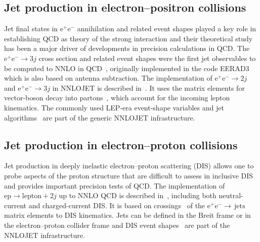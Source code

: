 \documentclass{SciPost}
\DeclareRobustCommand{\ensuremathrm}[1]{\ensuremath{\mathrm{#1}}}
\DeclareRobustCommand{\jets}{{\mathrm{jets}}\xspace}
\DeclareRobustCommand{\Pe}{{\ensuremathrm{e}}\xspace}
\DeclareRobustCommand{\Pep}{{\ensuremathrm{e^+}}\xspace}
\DeclareRobustCommand{\Pem}{{\ensuremathrm{e^-}}\xspace}
\DeclareRobustCommand{\Pp}{{\ensuremathrm{p}}\xspace}
\begin{document}
\subsection{Jet production in electron--positron collisions}
Jet final states in $\Pep\Pem$ annihilation and related event shapes played a key role in establishing QCD as theory of the strong interaction and their
theoretical study has been a major driver of developments in precision calculations in QCD. The $\Pep\Pem\to 3j$ cross section and related event shapes were the first jet
observables to be computed to NNLO in QCD~\cite{Gehrmann-DeRidder:2007vsv}, originally
implemented in the code EERAD3~\cite{Gehrmann-DeRidder:2014hxk} which is also based on antenna subtraction.
The implementation of $\Pep\Pem\to 2j$ and $\Pep\Pem\to 3j$  in NNLOJET is described in~\cite{Gehrmann:2017xfb}. It uses the matrix elements
for vector-boson decay into partons~\cite{Hagiwara:1988pp,Berends:1988yn,Bern:1997sc,Garland:2001tf,Garland:2002ak,Gehrmann:2002zr,Gehrmann:2011ab}, which account for the incoming lepton kinematics. The commonly used LEP-era event-shape variables and jet algorithms~\cite{Biebel:2001dm} are part
of the generic NNLOJET infrastructure.

\subsection{Jet production in electron--proton collisions}
Jet production in deeply inelastic electron--proton scattering (DIS) allows one to probe aspects of the proton structure that are difficult to assess in inclusive DIS
and provides important precision tests of QCD. The implementation of
$\Pe\Pp\to \mathrm{lepton}+2j$ up to NNLO QCD is described in~\cite{Currie:2017tpe,Niehues:2018was}, including both neutral-current and charged-current DIS.
It is based on crossings~\cite{Gehrmann:2002zr}  of the $\Pep\Pem\to\,\jets$ matrix
elements to DIS kinematics.
Jets can be defined in the Breit frame or in the electron--proton collider frame and DIS event shapes~\cite{Gehrmann:2019hwf}
are part of the NNLOJET infrastructure.

\end{document}
